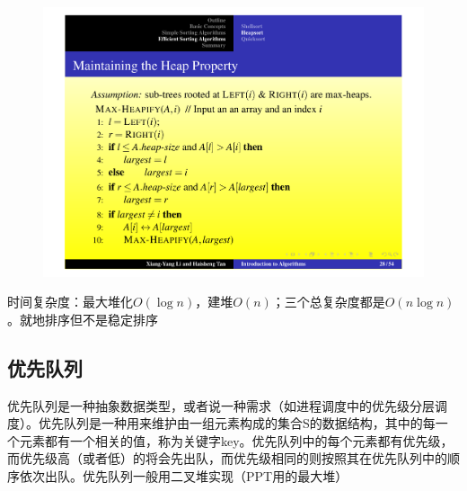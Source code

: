 \documentclass[]{report}
\begin{document}
\begin{figure}[h!]
\begin{minipage}{20em}
\begin{minipage}{20em}
				\end{minipage}
			\end{minipage}\quad
			\begin{minipage}{20em}
				\centering
				\includegraphics[scale = 0.25]{images/Max_Heapfy.pdf}
			\end{minipage}
		\end{figure}
		时间复杂度：最大堆化$O(\log n)$，建堆$O(n)$；三个总复杂度都是$O(n\log n)$。就地排序但不是稳定排序
		\subsection{优先队列}
		优先队列是一种抽象数据类型，或者说一种需求（如进程调度中的优先级分层调度）。优先队列是一种用来维护由一组元素构成的集合S的数据结构，其中的每一个元素都有一个相关的值，称为关键字key。优先队列中的每个元素都有优先级，而优先级高（或者低）的将会先出队，而优先级相同的则按照其在优先队列中的顺序依次出队。优先队列一般用二叉堆实现（PPT用的最大堆）
\end{document}
